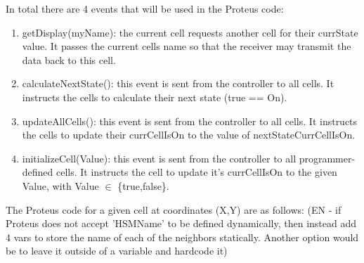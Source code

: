In total there are 4 events that will be used in the Proteus code:
\begin{enumerate}
    \item getDisplay(myName): the current cell requests another cell for their currState value.
    It passes the current cells name so that the receiver may transmit the data back to this cell.
    \item calculateNextState(): this event is sent from the controller to all cells.
    It instructs the cells to calculate their next state (true == On).
    \item updateAllCells(): this event is sent from the controller to all cells.
    It instructs the cells to update their currCellIsOn to the value of nextStateCurrCellIsOn.
    \item initializeCell(Value): this event is sent from the controller to all programmer-defined cells.
    It instructs the cell to update it's currCellIsOn to the given Value, with Value $\in$ \{true,false\}.
\end{enumerate}

The Proteus code for a given cell at coordinates (X,Y) are as follows:
(EN - if Proteus does not accept 'HSMName' to be defined dynamically, then instead add 4 vars to store the name of each of the neighbors statically. Another option would be to leave it outside of a variable and hardcode it)

